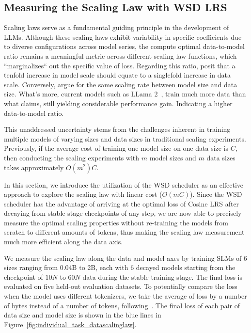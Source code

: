\subsection{Measuring the Scaling Law with WSD LRS}
\label{scalinglawwsdlrs}
Scaling laws serve as a fundamental guiding principle in the development of LLMs. Although these scaling laws exhibit variability in specific coefficients due to diverse configurations across model series, the compute optimal data-to-model ratio remains a meaningful metric across different scaling law functions, which ``marginalizes`` out the specific value of loss. Regarding this ratio, \cite{kaplan2020scaling} posit that a tenfold increase in model scale should equate to a singlefold increase in data scale. Conversely, \cite{hoffmann2022training} argue for the same scaling rate between model size and data size. What's more, current models such as LLama 2~\citep{touvron2023llama}, train much more data than what \cite{hoffmann2022training} claims, still yielding considerable performance gain. Indicating a higher data-to-model ratio. 

This unaddressed uncertainty stems from the challenges inherent in training multiple models of varying sizes and data sizes in traditional scaling experiments. Previously, if the average cost of training one model size on one data size is $C$, then conducting the scaling experiments with $m$ model sizes and $m$ data sizes takes approximately $O(m^2)C$. 


In this section, we introduce the utilization of the WSD scheduler as an effective approach to explore the scaling law with linear cost ($O(mC)$).
Since the WSD scheduler has the advantage of arriving at the optimal loss of Cosine LRS after decaying from stable stage checkpoints of any step, we are now able to precisely measure the optimal scaling properties without re-training the models from scratch to different amounts of tokens, thus making the scaling law measurement much more efficient along the data axis.

We measure the scaling law along the data and model axes by training SLMs of 6 sizes ranging from 0.04B to 2B, each with 6 decayed models starting from the checkpoint of $10N$ to $60N$ data during the stable training stage. The final loss is evaluated on five held-out evaluation datasets. To potentially compare the loss when the model uses different tokenizers, we take the average of loss by a number of bytes instead of a number of tokens, following~\cite{achiam2023gpt}. The final loss of each pair of data size and model size is shown in the blue lines in Figure~\ref{fig:individual_task_datascalinglaw}. 


